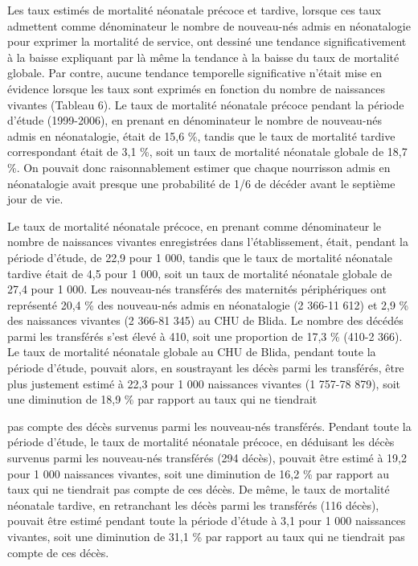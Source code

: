 \documentclass[
]{book}
\begin{document}
Les taux estimés de mortalité néonatale précoce et tardive, lorsque ces taux admettent comme dénominateur le nombre de nouveau-nés admis en néonatalogie pour exprimer la mortalité de service, ont dessiné une tendance significativement à la baisse expliquant par là même la tendance à la baisse du taux de mortalité globale. Par contre, aucune tendance temporelle significative n'était mise en évidence lorsque les taux sont exprimés en fonction du nombre de naissances vivantes (Tableau 6). Le taux de mortalité néonatale précoce pendant la période d'étude (1999-2006), en prenant en dénominateur le nombre de nouveau-nés admis en néonatalogie, était de 15,6 \%, tandis que le taux de mortalité tardive correspondant était de 3,1 \%, soit un taux de mortalité néonatale globale de 18,7 \%. On pouvait donc raisonnablement estimer que chaque nourrisson admis en néonatalogie avait presque une probabilité de 1/6 de décéder avant le septième jour de vie.

Le taux de mortalité néonatale précoce, en prenant comme dénominateur le nombre de naissances vivantes enregistrées dans l'établissement, était, pendant la période d'étude, de 22,9 pour 1 000, tandis que le taux de mortalité néonatale tardive était de 4,5 pour 1 000, soit un taux de mortalité néonatale globale de 27,4 pour 1 000. Les nouveau-nés transférés des maternités périphériques ont représenté 20,4 \% des nouveau-nés admis en néonatalogie (2 366-11 612) et 2,9 \% des naissances vivantes (2 366-81 345) au CHU de Blida. Le nombre des décédés parmi les transférés s'est élevé à 410, soit une proportion de 17,3 \% (410-2 366). Le taux de mortalité néonatale globale au CHU de Blida, pendant toute la période d'étude, pouvait alors, en soustrayant les décès parmi les transférés, être plus justement estimé à 22,3 pour 1 000 naissances vivantes (1 757-78 879), soit une diminution de 18,9 \% par rapport au taux qui ne tiendrait

pas compte des décès survenus parmi les nouveau-nés transférés. Pendant toute la période d'étude, le taux de mortalité néonatale précoce, en déduisant les décès survenus parmi les nouveau-nés transférés (294 décès), pouvait être estimé à 19,2 pour 1 000 naissances vivantes, soit une diminution de 16,2 \% par rapport au taux qui ne tiendrait pas compte de ces décès. De même, le taux de mortalité néonatale tardive, en retranchant les décès parmi les transférés (116 décès), pouvait être estimé pendant toute la période d'étude à 3,1 pour 1 000 naissances vivantes, soit une diminution de 31,1 \% par rapport au taux qui ne tiendrait pas compte de ces décès.
\end{document}
